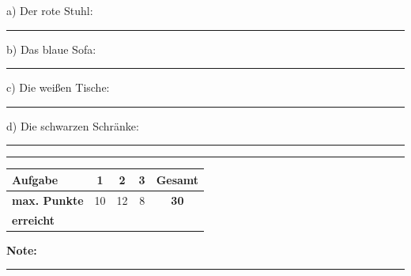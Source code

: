 \documentclass[11pt, a4paper]{article}
\newcommand{\luecke}[1]{\rule{#1}{0.4pt}}
\begin{document}
\noindent
a) Der rote Stuhl: \luecke{6cm}

\vspace{0.8em}

\noindent
b) Das blaue Sofa: \luecke{6cm}

\vspace{0.8em}

\noindent
c) Die weißen Tische: \luecke{6cm}

\vspace{0.8em}

\noindent
d) Die schwarzen Schränke: \luecke{6cm}


\vspace{25pt}
\hrule
\vspace{10pt}

\noindent
\begin{tabularx}{\textwidth}{|X|c|c|c||c|}
\hline
\textbf{Aufgabe} & 1 & 2 & 3 & \textbf{Gesamt} \\
\hline
\textbf{max. Punkte} & 10 & 12 & 8 & \textbf{30} \\
\hline
\textbf{erreicht} & & & & \\[0.8em]
\hline
\end{tabularx}

\vspace{10pt}

\begin{flushright}
\textbf{Note:} \luecke{2cm}
\end{flushright}
\end{document}

